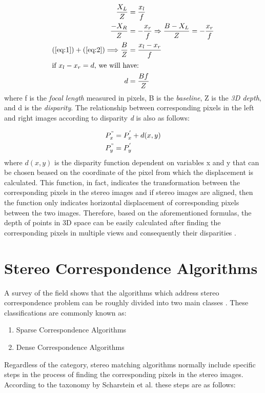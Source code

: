 \begin{align}
\frac{X_{L}}{Z} &= \frac{x_{l}}{f} \label{eq:1} \\
\frac{-X_{R}}{Z} &= -\frac{x_{r}}{f}  \Rightarrow \frac{B-X_{L}}{Z}=-\frac{x_{r}}{f} \label{eq:2} \\
(\ref{eq:1}) + (\ref{eq:2}) \Longrightarrow  \frac{B}{Z} &= \frac{x_{l}-x_{r}}{f} \label{eq:3} \\
\intertext{if $x_{l}-x_{r}=d$, we will have:}
d &= \frac{Bf}{Z} \label{eq:dispeq}
\end{align}
where f is the {\it focal length} measured in pixels, B is the {\it baseline}, Z is the {\it 3D depth}, and d is the {\it disparity}. The relationship between corresponding pixels in the left
and right images according to disparity {\it d} is also as follows:

\begin{align}
{P}^{"}_{x} &= {P}^{'}_{x}+d(x,y) \\
{P}^{"}_{y} &= {P}^{'}_{y}
\end{align}
where $d(x,y)$ is the disparity function dependent on variables x and y that can be chosen beased on the coordinate of the pixel from which the displacement is
calculated.
This function, in fact, indicates the transformation between the corresponding pixels in the stereo images and if stereo images are aligned, then the function
only indicates horizontal displacement of corresponding pixels between the two images. 
Therefore, based on the aforementioned formulas, the depth of points in 3D space can be easily calculated after finding the corresponding pixels in multiple views and consequently their
disparities \cite{bol87,oku93,sch02}.

\section{Stereo Correspondence Algorithms}
A survey of the field shows that the algorithms which address stereo correspondence problem can be roughly divided into two main classes \cite{sch02}. These classifications are commonly known as:
\begin{enumerate}
\item Sparse Correspondence Algorithms
\item Dense Correspondence Algorithms 
\end{enumerate}

Regardless of the category, stereo matching algorithms normally include specific steps in the process of finding the corresponding pixels in the stereo images.
According to the taxonomy by Scharstein et al. these steps are as follows:

